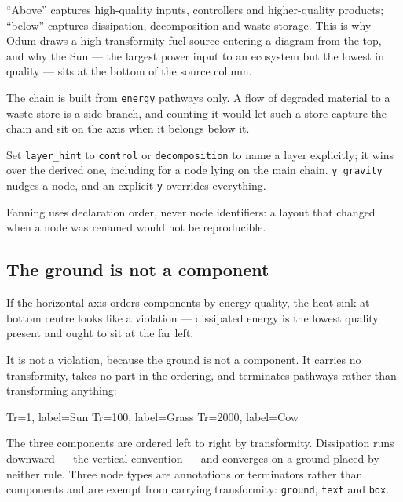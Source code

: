 \documentclass{article}
\begin{document}
``Above'' captures high-quality inputs, controllers and higher-quality products;
``below'' captures dissipation, decomposition and waste storage. This is why
Odum draws a high-transformity fuel source entering a diagram from the top, and
why the Sun --- the largest power input to an ecosystem but the lowest in
quality --- sits at the bottom of the source column.

The chain is built from \texttt{energy} pathways only. A flow of degraded
material to a waste store is a side branch, and counting it would let such a
store capture the chain and sit on the axis when it belongs below it.

Set \texttt{layer\_hint} to \texttt{control} or \texttt{decomposition} to name a
layer explicitly; it wins over the derived one, including for a node lying on
the main chain. \texttt{y\_gravity} nudges a node, and an explicit \texttt{y}
overrides everything.

Fanning uses declaration order, never node identifiers: a layout that changed
when a node was renamed would not be reproducible.

\subsection{The ground is not a component}

If the horizontal axis orders components by energy quality, the heat sink at
bottom centre looks like a violation --- dissipated energy is the lowest quality
present and ought to sit at the far left.

It is not a violation, because the ground is not a component. It carries no
transformity, takes no part in the ordering, and terminates pathways rather than
transforming anything:

\begin{center}
\begin{energese}
         {Tr=1,    label={Sun}}
     {Tr=100,  label={Grass}}
       {Tr=2000, label={Cow}}
\end{energese}
\end{center}

The three components are ordered left to right by transformity. Dissipation runs
downward --- the vertical convention --- and converges on a ground placed by
neither rule. Three node types are annotations or terminators rather than
components and are exempt from carrying transformity: \texttt{ground},
\texttt{text} and \texttt{box}.
\end{document}
